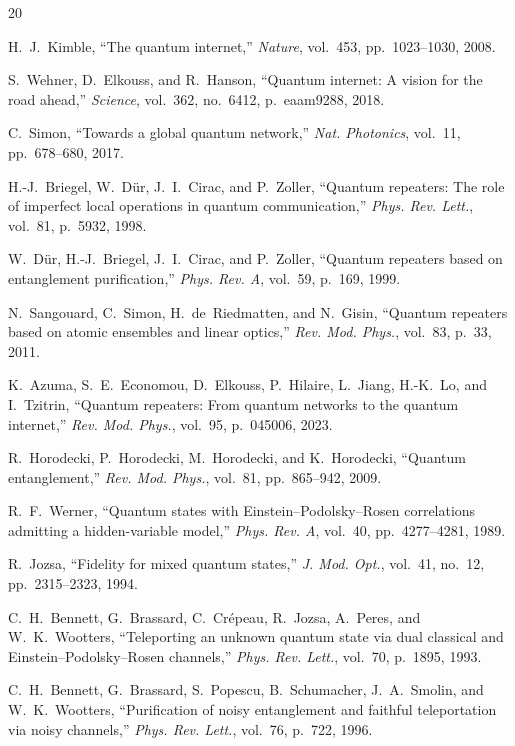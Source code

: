 \documentclass[10pt,a4paper]{article}
\begin{document}
\begin{thebibliography}{20}

H.~J.~Kimble, ``The quantum internet,''
\emph{Nature}, vol.~453, pp.~1023--1030, 2008.

S.~Wehner, D.~Elkouss, and R.~Hanson,
``Quantum internet: A vision for the road ahead,''
\emph{Science}, vol.~362, no.~6412, p.~eaam9288, 2018.

C.~Simon, ``Towards a global quantum network,''
\emph{Nat. Photonics}, vol.~11, pp.~678--680, 2017.

H.-J.~Briegel, W.~D\"ur, J.~I.~Cirac, and P.~Zoller,
``Quantum repeaters: The role of imperfect local operations in quantum
communication,''
\emph{Phys. Rev. Lett.}, vol.~81, p.~5932, 1998.

W.~D\"ur, H.-J.~Briegel, J.~I.~Cirac, and P.~Zoller,
``Quantum repeaters based on entanglement purification,''
\emph{Phys. Rev. A}, vol.~59, p.~169, 1999.

N.~Sangouard, C.~Simon, H.~de~Riedmatten, and N.~Gisin,
``Quantum repeaters based on atomic ensembles and linear optics,''
\emph{Rev. Mod. Phys.}, vol.~83, p.~33, 2011.

K.~Azuma, S.~E.~Economou, D.~Elkouss, P.~Hilaire, L.~Jiang,
H.-K.~Lo, and I.~Tzitrin,
``Quantum repeaters: From quantum networks to the quantum internet,''
\emph{Rev. Mod. Phys.}, vol.~95, p.~045006, 2023.

R.~Horodecki, P.~Horodecki, M.~Horodecki, and K.~Horodecki,
``Quantum entanglement,''
\emph{Rev. Mod. Phys.}, vol.~81, pp.~865--942, 2009.

R.~F.~Werner, ``Quantum states with Einstein--Podolsky--Rosen
correlations admitting a hidden-variable model,''
\emph{Phys. Rev. A}, vol.~40, pp.~4277--4281, 1989.

R.~Jozsa, ``Fidelity for mixed quantum states,''
\emph{J. Mod. Opt.}, vol.~41, no.~12, pp.~2315--2323, 1994.

C.~H.~Bennett, G.~Brassard, C.~Cr\'epeau, R.~Jozsa, A.~Peres, and
W.~K.~Wootters,
``Teleporting an unknown quantum state via dual classical and
Einstein--Podolsky--Rosen channels,''
\emph{Phys. Rev. Lett.}, vol.~70, p.~1895, 1993.

C.~H.~Bennett, G.~Brassard, S.~Popescu, B.~Schumacher, J.~A.~Smolin,
and W.~K.~Wootters,
``Purification of noisy entanglement and faithful teleportation via
noisy channels,''
\emph{Phys. Rev. Lett.}, vol.~76, p.~722, 1996.


\end{thebibliography}
\end{document}
